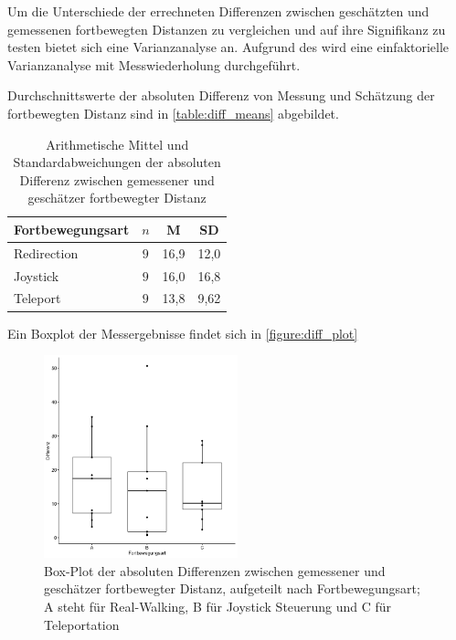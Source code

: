                     Um die Unterschiede der errechneten Differenzen zwischen geschätzten und gemessenen fortbewegten Distanzen zu vergleichen und auf ihre Signifikanz zu testen bietet sich eine Varianzanalyse an.
                    Aufgrund des  wird eine einfaktorielle Varianzanalyse mit Messwiederholung durchgeführt.

                    Durchschnittswerte der absoluten Differenz von Messung und Schätzung der fortbewegten Distanz sind in \autoref{table:diff_means} abgebildet.

                    \begin{table}[!h]
                        \renewcommand\arraystretch{1.2}
                        \centering
                        \begin{tabular}{lccc} \toprule
                            Fortbewegungsart& $n$ & M    & SD   \\ \midrule
                            Redirection     & $9$ & 16,9 & 12,0 \\
                            Joystick        & $9$ & 16,0 & 16,8 \\
                            Teleport        & $9$ & 13,8 & 9,62 \\ \bottomrule
                        \end{tabular}
                        \caption{Arithmetische Mittel und Standardabweichungen der absoluten Differenz zwischen gemessener und geschätzer fortbewegter Distanz}\label{table:diff_means}
                    \end{table}

                    Ein Boxplot der Messergebnisse findet sich in \autoref{figure:diff_plot}

                    \begin{figure}[!h]
                        \centering
                        \includegraphics[width=0.5\textwidth]{plots/diff_plot.png}
                        \caption{Box-Plot der absoluten Differenzen zwischen gemessener und geschätzer fortbewegter Distanz, aufgeteilt nach Fortbewegungsart; A steht für Real-Walking, B für Joystick Steuerung und C für Teleportation}\label{figure:diff_plot}
                    \end{figure}

